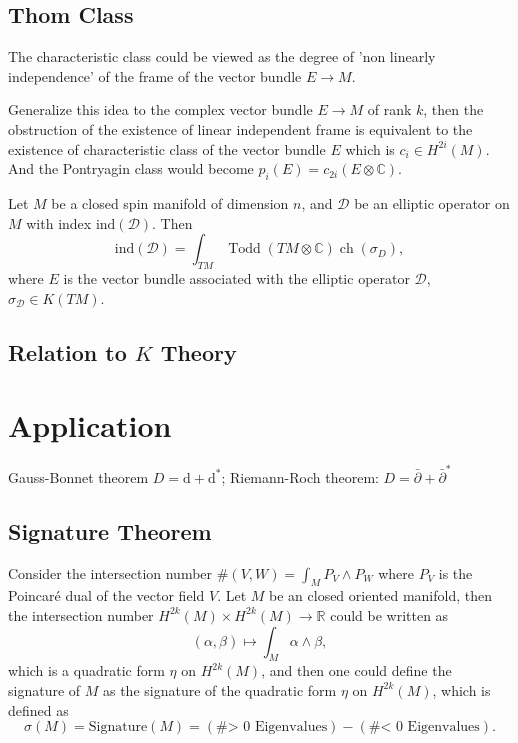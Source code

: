 \documentclass[10pt]{article}
\begin{document}
\subsection{Thom Class}

The characteristic class could be viewed as the degree of 'non linearly independence' of the frame of the vector bundle $ E \rightarrow M$.

Generalize this idea to the complex vector bundle $ E \rightarrow M$ of rank $ k$, then the obstruction of the existence of linear independent frame is equivalent to the existence of characteristic class of the vector bundle $ E$ which is $ c_{i} \in H^{2i} (M)$.
And the Pontryagin class would become $ p_{i}(E) = c_{2i} (E \otimes \mathbb{C})$.

\begin{theorem}
  Let $ M$ be a closed spin manifold of dimension $ n$, and $ \mathcal{D}$ be an elliptic operator on $ M$ with index $ \mathrm{ind}(\mathcal{D})$. Then
  \begin{equation*}
    \mathrm{ind}(\mathcal{D}) = \int_{TM} \operatorname{Todd}(TM \otimes  \mathbb{C}) \operatorname{ch}(\sigma_{D}),
  \end{equation*}
  where $ E$ is the vector bundle associated with the elliptic operator $ \mathcal{D}$, $ \sigma_{\mathcal{D}} \in K(TM)$.
\end{theorem}

\subsection{\texorpdfstring{Relation to $K$ Theory}{Relation to K Theory}}

\section{Application}

Gauss-Bonnet theorem $ D = \mathrm{d} + \mathrm{d} ^{*}$; Riemann-Roch theorem: $ D = \bar{\partial} + \bar{\partial}^{*}$

\subsection{Signature Theorem}

Consider the intersection number $\# (V,W) = \int _{M} P_{V}\wedge P_{W}$ where $ P_{V}$ is the Poincaré dual of the vector field $ V$. Let $ M$ be an closed oriented manifold, then the intersection number $ H^{2k}(M) \times H^{2k}(M) \rightarrow \mathbb{R}$ could be written as
\begin{equation*}
  \left( \alpha,\beta \right) \mapsto \int_{M} \alpha \wedge \beta,
\end{equation*}
which is a quadratic form $ \eta$ on $ H^{2k}(M)$, and then one could define the signature of $ M$ as the signature of the quadratic form $ \eta$ on $ H^{2k}(M)$, which is defined as
\begin{equation*}
  \sigma(M) = \text{Signature}(M) = \left( \text{\# > 0 Eigenvalues} \right) - \left( \text{\# < 0 Eigenvalues} \right).
\end{equation*}
\end{document}
